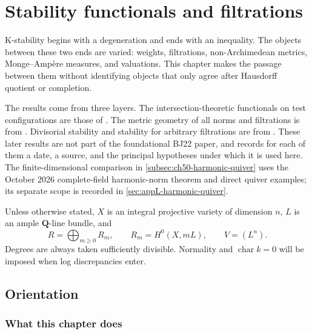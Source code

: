 \chapter{Stability functionals and filtrations}
\label{chap:bj-stability}

\begingroup
{}

K-stability begins with a degeneration and ends with an inequality.  The
objects between these two ends are varied: weights, filtrations,
non-Archimedean metrics, Monge--Amp\`ere measures, and valuations.  This
chapter makes the passage between them without identifying objects that
only agree after Hausdorff quotient or completion.

The results come from three layers.  The intersection-theoretic functionals
on test configurations are those of \cite{BHJ17}.  The metric geometry of
all norms and filtrations is from \cite{BJKS1}.  Divisorial stability and
stability for arbitrary filtrations are from \cite{BJKS2}.  These later
results are not part of the foundational BJ22 paper, and
 records for each of them a date, a source, and the
principal hypotheses under which it is used here.
The finite-dimensional comparison in \cref{subsec:ch50-harmonic-quiver}
uses the October 2026 complete-field harmonic-norm theorem and direct
quiver examples; its separate scope is recorded in
\cref{sec:appL-harmonic-quiver}.

Unless otherwise stated, $X$ is an integral projective variety of
dimension $n$, $L$ is an ample $\mathbf Q$-line bundle, and
\[
             R=\bigoplus_{m\geq0}R_m,\qquad
             R_m=H^0(X,mL),\qquad V=(L^n).
\tag{50.1}\label{eq:stability-section-ring}
\]
Degrees are always taken sufficiently divisible.  Normality and
$\operatorname{char}k=0$ will be imposed when log discrepancies enter.

\section{Orientation}
\label{sec:ch50-orientation}

\subsection{What this chapter does}
\label{sec:ch50-what}

